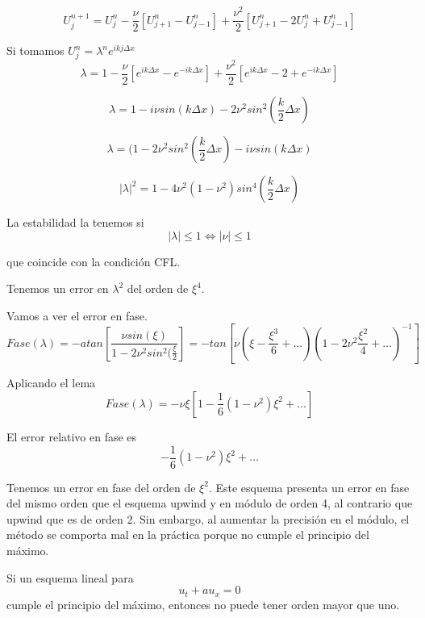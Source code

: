 $$U_j^{n+1} = U_j^n - \frac{\nu}{2}\left[U_{j+1}^n-U_{j-1}^n\right] + \frac{\nu^2}{2}\left[U_{j+1}^{n}-2U_{j}^{n}+U_{j-1}^{n}\right]$$

Si tomamos $U_j^n = \lambda ^n e^{ikj\Delta x}$
$$\lambda = 1 - \frac{\nu}{2}\left[e^{ik\Delta x}-e^{-ik\Delta x}\right]+\frac{\nu^2}{2}\left[e^{ik\Delta x}-2+e^{-ik\Delta x}\right]$$

$$\lambda = 1-i\nu sin(k\Delta x) - 2\nu ^2sin^2(\frac{k}{2}\Delta x)$$

$$\lambda = (1-2\nu^2sin^2(\frac{k}{2}\Delta x)-i\nu sin(k\Delta x)$$

$$|\lambda|^2 = 1-4\nu^2(1-\nu^2)sin^4(\frac{k}{2}\Delta x)$$

La estabilidad la tenemos si 
$$|\lambda|\le 1 \iff |\nu| \le 1$$

que coincide con la condición CFL.

Tenemos un error en $\lambda^2$ del orden de $\xi^4$.

Vamos a ver el error en fase.
$$Fase(\lambda) = -atan\left[\frac{\nu sin(\xi)}{1-2\nu^2sin^2(\frac{\xi}{2}}\right] = -tan\left[\nu(\xi-\frac{\xi^3}{6}+\hdots)(1-2\nu^2\frac{\xi^2}{4}+\hdots )^{-1}\right]$$

Aplicando el lema
$$Fase(\lambda) = -\nu\xi\left[1-\frac{1}{6}(1-\nu^2)\xi^2+\hdots\right]$$

El error relativo en fase es
$$-\frac{1}{6}(1-\nu^2)\xi^2+\hdots$$

Tenemos un error en fase del orden de $\xi^2$. Este esquema presenta un error en fase del mismo orden que el esquema upwind y en módulo de orden 4, al contrario que upwind que es de orden 2. Sin embargo, al aumentar la precisión en el módulo, el método se comporta mal en la práctica porque no cumple el principio del máximo.

\begin{theorem}
	Si un esquema lineal para $$u_t+au_x = 0$$
	cumple el principio del máximo, entonces no puede tener orden mayor que uno.
\end{theorem}



